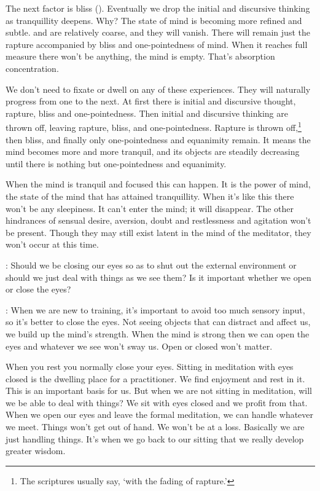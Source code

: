 The next factor is bliss (). Eventually we drop the initial and discursive thinking as tranquillity deepens. Why? The state of mind is becoming more refined and subtle.  and  are relatively coarse, and they will vanish. There will remain just the rapture accompanied by bliss and one-pointedness of mind. When it reaches full measure there won't be anything, the mind is empty. That's absorption concentration.

We don't need to fixate or dwell on any of these experiences. They will naturally progress from one to the next. At first there is initial and discursive thought, rapture, bliss and one-pointedness. Then initial and discursive thinking are thrown off, leaving rapture, bliss, and one-pointedness. Rapture is thrown off,\footnote{The scriptures usually say, `with the fading of rapture.'} then bliss, and finally only one-pointedness and equanimity remain. It means the mind becomes more and more tranquil, and its objects are steadily decreasing until there is nothing but one-pointedness and equanimity.

When the mind is tranquil and focused this can happen. It is the power of mind, the state of the mind that has attained tranquillity. When it's like this there won't be any sleepiness. It can't enter the mind; it will disappear. The other hindrances of sensual desire, aversion, doubt and restlessness and agitation won't be present. Though they may still exist latent in the mind of the meditator, they won't occur at this time.

: Should we be closing our eyes so as to shut out the external environment or should we just deal with things as we see them? Is it important whether we open or close the eyes?

: When we are new to training, it's important to avoid too much sensory input, so it's better to close the eyes. Not seeing objects that can distract and affect us, we build up the mind's strength. When the mind is strong then we can open the eyes and whatever we see won't sway us. Open or closed won't matter.

When you rest you normally close your eyes. Sitting in meditation with eyes closed is the dwelling place for a practitioner. We find enjoyment and rest in it. This is an important basis for us. But when we are not sitting in meditation, will we be able to deal with things? We sit with eyes closed and we profit from that. When we open our eyes and leave the formal meditation, we can handle whatever we meet. Things won't get out of hand. We won't be at a loss. Basically we are just handling things. It's when we go back to our sitting that we really develop greater wisdom.

